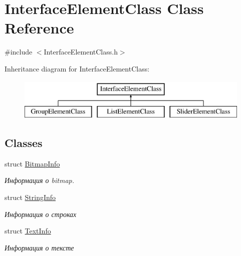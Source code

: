 \hypertarget{class_interface_element_class}{}\section{Interface\+Element\+Class Class Reference}
\label{class_interface_element_class}


{\ttfamily \#include $<$Interface\+Element\+Class.\+h$>$}

Inheritance diagram for Interface\+Element\+Class\+:\begin{figure}[H]
\begin{center}
\leavevmode
\includegraphics[height=2.000000cm]{class_interface_element_class}
\end{center}
\end{figure}
\subsection*{Classes}
\begin{DoxyCompactItemize}
\item 
struct \hyperlink{struct_interface_element_class_1_1_bitmap_info}{Bitmap\+Info}
\begin{DoxyCompactList}\small\item\em Информация о bitmap. \end{DoxyCompactList}\item 
struct \hyperlink{struct_interface_element_class_1_1_string_info}{String\+Info}
\begin{DoxyCompactList}\small\item\em Информация о строках \end{DoxyCompactList}\item 
struct \hyperlink{struct_interface_element_class_1_1_text_info}{Text\+Info}
\begin{DoxyCompactList}\small\item\em Информация о тексте \end{DoxyCompactList}\end{DoxyCompactItemize}
